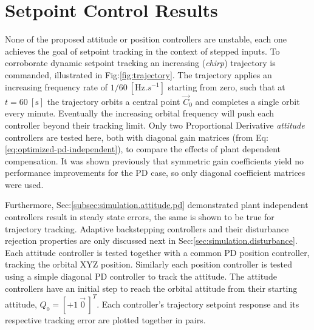 \section{Setpoint Control Results}
\label{sec:simulation.autopilot}
None of the proposed attitude or position controllers are unstable, each one achieves the goal of setpoint tracking in the context of stepped inputs. To corroborate dynamic setpoint tracking an increasing (\emph{chirp}) trajectory is commanded, illustrated in Fig:\ref{fig:trajectory}. The trajectory applies an increasing frequency rate of $1/60~[\text{Hz}.s^{-1}]$ starting from zero, such that at $t=60~[\text{s}]$ the trajectory orbits a central point $\vec{C}_0$ and completes a single orbit every minute. Eventually the increasing orbital frequency will push each controller beyond their tracking limit. Only two Proportional Derivative \emph{attitude} controllers are tested here, both with diagonal gain matrices (from Eq:\ref{eq:optimized-pd-independent}), to compare the effects of plant dependent compensation. It was shown previously that symmetric gain coefficients yield no performance improvements for the PD case, so only diagonal coefficient matrices were used. 
\par
Furthermore, Sec:\ref{subsec:simulation.attitude.pd} demonstrated plant independent controllers result in steady state errors, the same is shown to be true for trajectory tracking. Adaptive backstepping controllers and their disturbance rejection properties are only discussed next in Sec:\ref{sec:simulation.disturbance}. Each attitude controller is tested together with a common PD position controller, tracking the orbital XYZ position. Similarly each position controller is tested using a simple diagonal PD controller to track the attitude. The attitude controllers have an initial step to reach the orbital attitude from their starting attitude, $Q_0=[+1~\vec{0}\hspace{2pt}]^T$. Each controller's trajectory setpoint response and its respective tracking error are plotted together in pairs.
